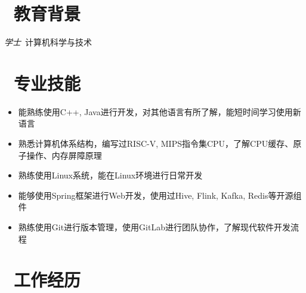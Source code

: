 \documentclass{resume}
\begin{document}



\section{\texorpdfstring{\faGraduationCap\ 教育背景}{教育背景}}
\textit{学士}\ 计算机科学与技术

\section{\texorpdfstring{\faCogs\ 专业技能}{专业技能}}
\begin{itemize}[parsep=0.5ex]
  \item 能熟练使用C++, Java进行开发，对其他语言有所了解，能短时间学习使用新语言
  \item 熟悉计算机体系结构，编写过RISC-V, MIPS指令集CPU，了解CPU缓存、原子操作、内存屏障原理
  \item 熟练使用Linux系统，能在Linux环境进行日常开发
  \item 能够使用Spring框架进行Web开发，使用过Hive, Flink, Kafka, Redis等开源组件
  \item 熟练使用Git进行版本管理，使用GitLab进行团队协作，了解现代软件开发流程
\end{itemize}

\section{\texorpdfstring{\faUsers\ 工作经历}{工作经历}}
\end{document}
